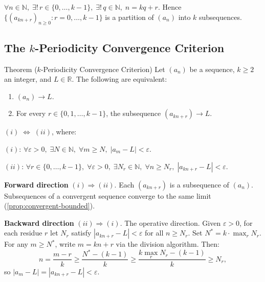 \begin{remark}
$\forall n \in \mathbb{N},\;\exists!\, r \in \{0,\ldots,k-1\},\;\exists!\, q
\in \mathbb{N},\;n = kq + r$. Hence $\{(a_{kn+r})_{n\geq 0} :
r = 0,\ldots,k-1\}$ is a partition of $(a_n)$ into $k$ subsequences.
\end{remark}



\subsection*{\texorpdfstring{The $k$-Periodicity Convergence Criterion}{The k-Periodicity Convergence Criterion}}
\label{subsec:k-periodicity}

\begin{theorembox}{Theorem ($k$-Periodicity Convergence Criterion)}
\label{thm:k-periodicity}
Let $(a_n)$ be a sequence, $k \geq 2$ an integer, and $L \in \mathbb{R}$.
The following are equivalent:
\begin{enumerate}[label=(\roman*)]
  \item $(a_n) \to L$.
  \item For every $r \in \{0, 1, \ldots, k-1\}$, the subsequence
        $(a_{kn+r}) \to L$.
\end{enumerate}
\end{theorembox}

\begin{remark}
$(i) \;\Leftrightarrow\; (ii)$, where:

$(i)$: $\forall \varepsilon > 0,\;\exists N \in \mathbb{N},\;\forall m \geq N,\;
|a_m - L| < \varepsilon$.

$(ii)$: $\forall r \in \{0,\ldots,k-1\},\;\forall \varepsilon > 0,\;
\exists N_r \in \mathbb{N},\;\forall n \geq N_r,\;|a_{kn+r} - L| < \varepsilon$.
\end{remark}

\begin{remark}
\noindent\textbf{Forward direction} $(i) \Rightarrow (ii)$.
Each $(a_{kn+r})$ is a subsequence of $(a_n)$. Subsequences of a convergent
sequence converge to the same limit (\cref{prop:convergent-bounded}).

\medskip
\noindent\textbf{Backward direction} $(ii) \Rightarrow (i)$.
The operative direction. Given $\varepsilon > 0$, for each residue $r$ let
$N_r$ satisfy $|a_{kn+r} - L| < \varepsilon$ for all $n \geq N_r$. Set
$N^* = k \cdot \max_{r} N_r$. For any $m \geq N^*$, write $m = kn + r$
via the division algorithm. Then:
\[
  n = \frac{m - r}{k} \geq \frac{N^* - (k-1)}{k}
    \geq \frac{k \max_r N_r - (k-1)}{k} \geq N_r,
\]
so $|a_m - L| = |a_{kn+r} - L| < \varepsilon$.
\end{remark}

